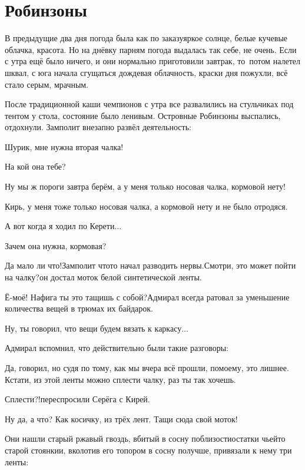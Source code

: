 \chapter{Робинзоны}
\vepsianrose

В предыдущие два дня погода была как по заказу\mdash яркое солнце, белые кучевые облачка, красота. Но на днёвку парням погода выдалась так себе, не очень. Если с утра ещё было ничего, и они нормально приготовили завтрак, то~потом налетел шквал, с юга начала сгущаться дождевая облачность, краски дня пожухли, всё стало серым, мрачным.

После традиционной каши чемпионов с утра все развалились на стульчиках под тентом у стола, состояние было ленивым. Островные Робинзоны выспались, отдохнули. Замполит внезапно развёл деятельность:

\diagdash Шурик, мне нужна вторая чалка!

\diagdash На кой она тебе?

\diagdash Ну мы ж пороги завтра берём, а у меня только носовая чалка, кормовой нету!

\diagdash Кирь, у меня тоже только носовая чалка, а кормовой нету и не было отродяся.

\diagdash А вот когда я ходил по Керети$\ldots$

\diagdash Зачем она нужна, кормовая?

\diagdash Да мало ли что!\mdash Замполит что\sdash то начал разводить нервы.\mdash Смотри, это может пойти на чалку?\mdash он достал моток белой синтетической ленты.

\diagdash Ё-моё! Нафига ты это тащишь с собой?\mdash Адмирал всегда ратовал за уменьшение количества вещей в трюмах их байдарок.

\diagdash Ну, ты говорил, что вещи будем вязать к каркасу$\ldots$

Адмирал вспомнил, что действительно были такие разговоры:

\diagdash Да, говорил, но судя по тому, как мы вчера всё прошли, по\sdash моему, это лишнее. Кстати, из этой ленты можно сплести чалку, раз ты так хочешь.

\diagdash Сплести?!\mdash переспросили Серёга с Кирей.

\diagdash Ну да, а что? Как косичку, из трёх лент. Тащи сюда свой моток!

Они нашли старый ржавый гвоздь, вбитый в сосну поблизости\mdash остатки чьей\sdash то старой стоянки\mdash и, вколотив его топором в сосну получше, привязали к нему три ленты:

